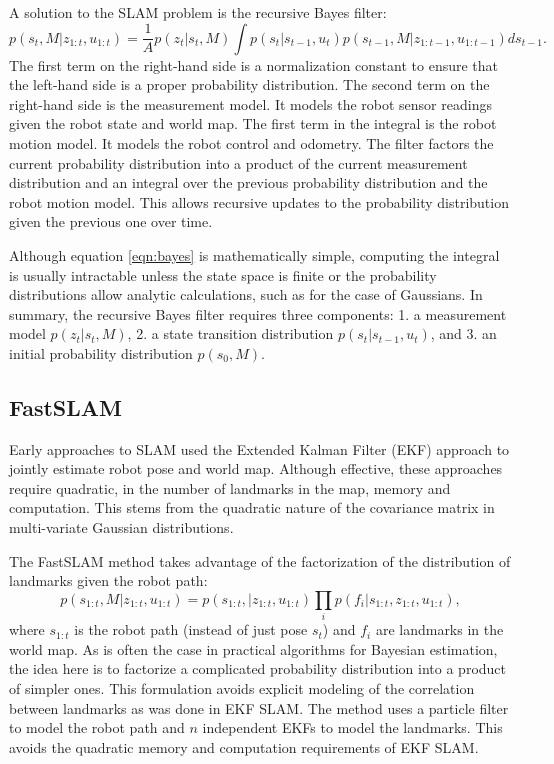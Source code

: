 \documentclass{article}
\begin{document}
A solution to the SLAM problem is the recursive Bayes filter:
\begin{equation}
p(s_t, M | z_{1:t}, u_{1:t}) = \frac{1}{A} p(z_t | s_t, M) \int p(s_t|s_{t-1},u_t) p(s_{t-1}, M | z_{1:t-1}, u_{1:t-1}) ds_{t-1}.
\label{eqn:bayes}
\end{equation}
The first term on the right-hand side is a normalization constant to ensure that the left-hand side is a proper probability distribution.  The second term on the right-hand side is the measurement model.  It models the robot sensor readings given the robot state and world map.  The first term in the integral is the robot motion model.  It models the robot control and odometry.  The filter factors the current probability distribution into a product of the current measurement distribution and an integral over the previous probability distribution and the robot motion model.  This allows recursive updates to the probability distribution given the previous one over time.

Although equation \ref{eqn:bayes} is mathematically simple, computing the integral is usually intractable unless the state space is finite or the probability distributions allow analytic calculations, such as for the case of Gaussians.  In summary, the recursive Bayes filter requires three components: 1. a measurement model $p(z_t | s_t, M)$, 2. a state transition distribution $p(s_t|s_{t-1},u_t)$, and 3. an initial probability distribution $p(s_0, M)$.

\subsection{FastSLAM}

Early approaches to SLAM used the Extended Kalman Filter (EKF) approach to jointly estimate robot pose and world map.  Although effective, these approaches require quadratic, in the number of landmarks in the map, memory and computation.  This stems from the quadratic nature of the covariance matrix in multi-variate Gaussian distributions.

The FastSLAM method takes advantage of the factorization of the distribution of landmarks given the robot path:
\begin{equation}
p(s_{1:t}, M | z_{1:t}, u_{1:t}) = p(s_{1:t}, | z_{1:t}, u_{1:t}) \prod_i p(f_i | s_{1:t}, z_{1:t}, u_{1:t}),
\end{equation}
where $s_{1:t}$ is the robot path (instead of just pose $s_t$) and $f_i$ are landmarks in the world map.  As is often the case in practical algorithms for Bayesian estimation, the idea here is to factorize a complicated probability distribution into a product of simpler ones.  This formulation avoids explicit modeling of the correlation between landmarks as was done in EKF SLAM.  The method uses a particle filter to model the robot path and $n$ independent EKFs to model the landmarks.  This avoids the quadratic memory and computation requirements of EKF SLAM.
\end{document}
